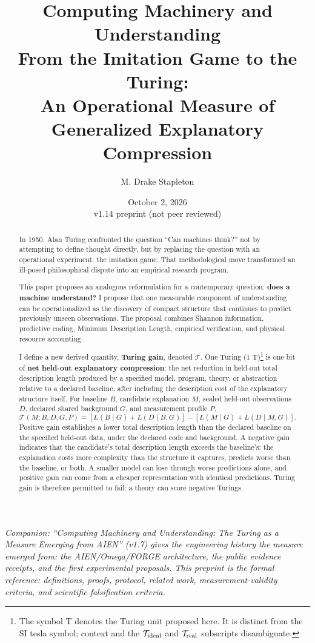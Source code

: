 \documentclass[11pt]{article}
\title{Computing Machinery and Understanding\\
From the Imitation Game to the Turing:\\
An Operational Measure of Generalized Explanatory Compression}
\author{M. Drake Stapleton}
\date{October 2, 2026\\v1.14 preprint (not peer reviewed)}
\begin{document}
\maketitle

\noindent\textit{Companion: ``Computing Machinery and Understanding: The Turing as a Measure Emerging from AIEN'' (v1.7) gives the engineering history the measure emerged from: the AIEN/Omega/FORGE architecture, the public evidence receipts, and the first experimental proposals. This preprint is the formal reference: definitions, proofs, protocol, related work, measurement-validity criteria, and scientific falsification criteria.}

\begin{abstract}
In 1950, Alan Turing confronted the question ``Can machines think?'' not by attempting to define thought directly, but by replacing the question with an operational experiment: the imitation game. That methodological move transformed an ill-posed philosophical dispute into an empirical research program.

This paper proposes an analogous reformulation for a contemporary question: \textbf{does a machine understand?} I propose that one measurable component of understanding can be operationalized as the discovery of compact structure that continues to predict previously unseen observations. The proposal combines Shannon information, predictive coding, Minimum Description Length, empirical verification, and physical resource accounting.

I define a new derived quantity, \textbf{Turing gain}, denoted \(\mathcal{T}\). One Turing (1 T)\footnote{The symbol T denotes the Turing unit proposed here. It is distinct from the SI tesla symbol; context and the \(\mathcal{T}_{\rm ideal}\) and \(\mathcal{T}_{\rm real}\) subscripts disambiguate.} is one bit of \textbf{net held-out explanatory compression}: the net reduction in held-out total description length produced by a specified model, program, theory, or abstraction relative to a declared baseline, after including the description cost of the explanatory structure itself. For baseline \(B\), candidate explanation \(M\), sealed held-out observations \(D\), declared shared background \(G\), and measurement profile \(P\),
\[
\mathcal{T}(M;B,D,G,P)
=
\left[L(B\mid G)+L(D\mid B,G)\right]
-
\left[L(M\mid G)+L(D\mid M,G)\right].
\]
Positive gain establishes a lower total description length than the declared baseline on the specified held-out data, under the declared code and background. A negative gain indicates that the candidate's total description length exceeds the baseline's: the explanation costs more complexity than the structure it captures, predicts worse than the baseline, or both. A smaller model can lose through worse predictions alone, and positive gain can come from a cheaper representation with identical predictions. Turing gain is therefore permitted to fail: a theory can score negative Turings.


\end{abstract}
\end{document}
